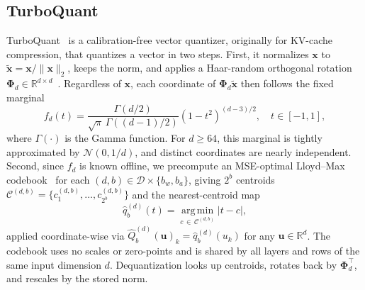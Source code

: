 \subsection{TurboQuant}
\label{sec:prelim:turboquant}
\vspace{-1mm}
TurboQuant~\cite{zandieh2025turboquant} is a calibration-free vector quantizer, originally for KV-cache compression, that quantizes a vector in two steps. First, it normalizes $\mathbf{x}$ to $\tilde{\mathbf{x}} = \mathbf{x} / \|\mathbf{x}\|_2$, keeps the norm, and applies a Haar-random orthogonal rotation $\boldsymbol{\Phi}_d \in \mathbb{R}^{d \times d}$~\cite{mezzadri2006generate}. Regardless of $\mathbf{x}$, each coordinate of $\boldsymbol{\Phi}_d \tilde{\mathbf{x}}$ then follows the fixed marginal
\begin{equation}
f_d(t) = \frac{\Gamma(d/2)}{\sqrt{\pi}\,\Gamma((d-1)/2)} (1 - t^2)^{(d-3)/2}, \quad t \in [-1, 1],
\label{eq:beta-marginal}
\end{equation}
where $\Gamma(\cdot)$ is the Gamma function. For $d \geq 64$, this marginal is tightly approximated by $\mathcal{N}(0, 1/d)$, and distinct coordinates are nearly independent. Second, since $f_d$ is known offline, we precompute an MSE-optimal Lloyd--Max codebook~\cite{lloyd1982least, max1960quantizing} for each $(d, b) \in \mathcal{D} \times \{b_w, b_a\}$, giving $2^b$ centroids $\mathcal{C}^{(d,b)} = \{c_1^{(d,b)}, \ldots, c_{2^b}^{(d,b)}\}$ and the nearest-centroid map
\begin{equation}
\hat{q}_b^{(d)}(t) = \operatorname*{arg\,min}_{c \,\in\, \mathcal{C}^{(d,b)}} |t - c|,
\label{eq:lloyd-max}
\end{equation}
applied coordinate-wise via $\hat{Q}_b^{(d)}(\mathbf{u})_k = \hat{q}_b^{(d)}(u_k)$ for any $\mathbf{u} \in \mathbb{R}^d$. The codebook uses no scales or zero-points and is shared by all layers and rows of the same input dimension $d$. Dequantization looks up centroids, rotates back by $\boldsymbol{\Phi}_d^\top$, and rescales by the stored norm.

